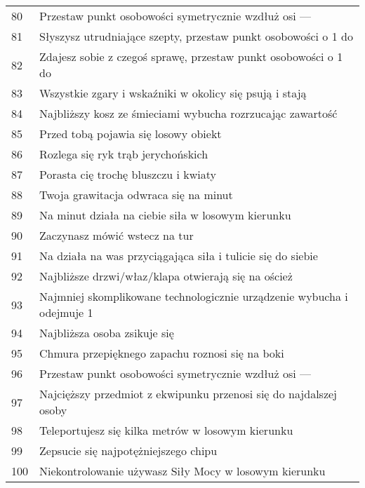\begin{longtabu}{ l l }
80			&	Przestaw punkt osobowości symetrycznie wzdłuż osi \aba --- \abp \\
81			&	Słyszysz utrudniające szepty, przestaw punkt osobowości o 1 do \aba \\
82			&	Zdajesz sobie z czegoś sprawę, przestaw punkt osobowości o 1 do \abi \\
83			&	Wszystkie zgary i wskaźniki w okolicy się psują i stają \\
84			&	Najbliższy kosz ze śmieciami wybucha rozrzucając zawartość \\
85			&	Przed tobą pojawia się losowy obiekt \\
86			&	Rozlega się ryk trąb jerychońskich \\
87			&	Porasta cię trochę bluszczu i kwiaty \\
88			&	Twoja grawitacja odwraca się na \diiii minut \\
89			&	Na \diiii minut działa na ciebie siła w losowym kierunku \\
90			&	Zaczynasz mówić wstecz na \diiii tur \\
91			&	Na \dxx działa na was przyciągająca siła i tulicie się do siebie \\
92			&	Najbliższe drzwi/właz/klapa otwierają się na oścież \\
93			&	Najmniej skomplikowane technologicznie urządzenie wybucha i odejmuje 1 \abzyc \\
94			&	Najbliższa osoba zsikuje się \\
95			&	Chmura przepięknego zapachu roznosi się na boki \\
96			&	Przestaw punkt osobowości symetrycznie wzdłuż osi \abs --- \abi \\
97			&	Najcięższy przedmiot z ekwipunku przenosi się do najdalszej osoby \\
98			&	Teleportujesz się kilka metrów w losowym kierunku \\
99			&	Zepsucie się najpotężniejszego chipu \\
100			&	Niekontrolowanie używasz Siły Mocy w losowym kierunku \\
\end{longtabu}

